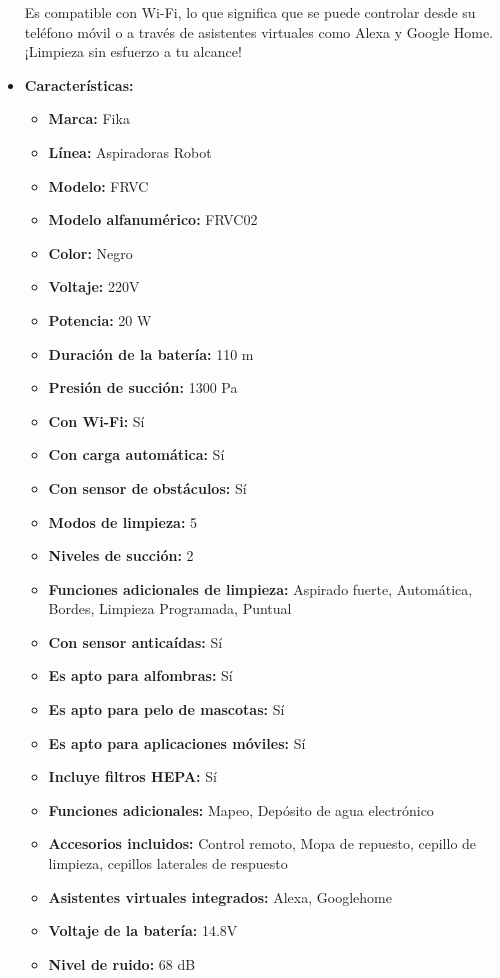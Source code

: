 \documentclass{article}
\begin{document}
\begin{adjustwidth}{2em}{}
\begin{itemize}
Es compatible con Wi-Fi, lo que significa que se puede controlar desde su teléfono móvil o a través de asistentes virtuales como Alexa y Google Home. ¡Limpieza sin esfuerzo a tu alcance!
    \item \textbf{Características:} 
    \begin{itemize}
        \item \textbf {Marca:} Fika
    \item \textbf {Línea:} Aspiradoras Robot
    \item \textbf {Modelo:} FRVC
    \item \textbf {Modelo alfanumérico:} FRVC02
    \item \textbf {Color:} Negro
    \item \textbf {Voltaje:} 220V
    \item \textbf {Potencia:} 20 W
    \item \textbf {Duración de la batería:} 110 m
    \item \textbf {Presión de succión:} 1300 Pa
    \item \textbf {Con Wi-Fi:} Sí
    \item \textbf {Con carga automática:} Sí
    \item \textbf {Con sensor de obstáculos:} Sí
    \item \textbf {Modos de limpieza:} 5
    \item \textbf {Niveles de succión:} 2
    \item \textbf {Funciones adicionales de limpieza:} Aspirado fuerte, Automática, Bordes, Limpieza Programada, Puntual
    \item \textbf {Con sensor anticaídas:} Sí
    \item \textbf {Es apto para alfombras:} Sí
    \item \textbf {Es apto para pelo de mascotas:} Sí
    \item \textbf {Es apto para aplicaciones móviles:} Sí
    \item \textbf {Incluye filtros HEPA:} Sí
    \item \textbf {Funciones adicionales:} Mapeo, Depósito de agua electrónico
    \item \textbf {Accesorios incluidos:} Control remoto, Mopa de repuesto, cepillo de limpieza, cepillos laterales de respuesto
    \item \textbf {Asistentes virtuales integrados:} Alexa, Googlehome
    \item \textbf {Voltaje de la batería:} 14.8V
    \item \textbf {Nivel de ruido:} 68 dB

\end{itemize}
\end{itemize}
\end{adjustwidth}
\end{document}
